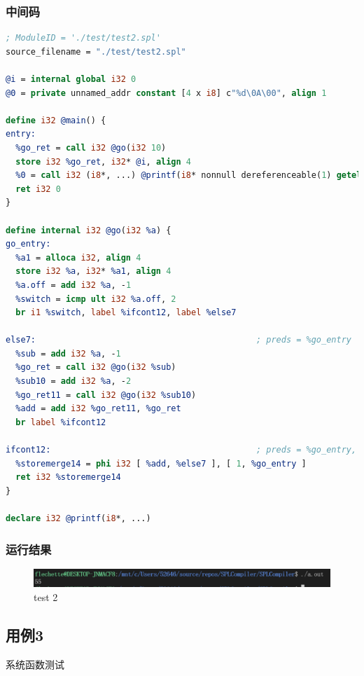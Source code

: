 \documentclass{article}
\begin{document}
\subsubsection{中间码}
\begin{lstlisting}[language=LLVM]
; ModuleID = './test/test2.spl'
source_filename = "./test/test2.spl"

@i = internal global i32 0
@0 = private unnamed_addr constant [4 x i8] c"%d\0A\00", align 1

define i32 @main() {
entry:
  %go_ret = call i32 @go(i32 10)
  store i32 %go_ret, i32* @i, align 4
  %0 = call i32 (i8*, ...) @printf(i8* nonnull dereferenceable(1) getelementptr inbounds ([4 x i8], [4 x i8]* @0, i64 0, i64 0), i32 %go_ret)
  ret i32 0
}

define internal i32 @go(i32 %a) {
go_entry:
  %a1 = alloca i32, align 4
  store i32 %a, i32* %a1, align 4
  %a.off = add i32 %a, -1
  %switch = icmp ult i32 %a.off, 2
  br i1 %switch, label %ifcont12, label %else7

else7:                                            ; preds = %go_entry
  %sub = add i32 %a, -1
  %go_ret = call i32 @go(i32 %sub)
  %sub10 = add i32 %a, -2
  %go_ret11 = call i32 @go(i32 %sub10)
  %add = add i32 %go_ret11, %go_ret
  br label %ifcont12

ifcont12:                                         ; preds = %go_entry, %else7
  %storemerge14 = phi i32 [ %add, %else7 ], [ 1, %go_entry ]
  ret i32 %storemerge14
}

declare i32 @printf(i8*, ...)

\end{lstlisting}

\subsubsection{运行结果}
\begin{figure}[H]
    \centering
    \includegraphics[width=1\textwidth]{test2res.png}
    \caption{test 2}
\end{figure}


\subsection{用例3}
\par 系统函数测试
\end{document}
